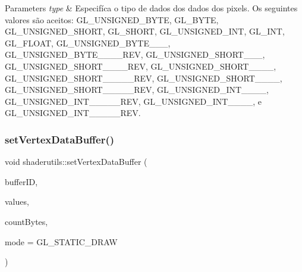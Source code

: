 \begin{DoxyParams}{Parameters}
\hline
{\em type} & Especifíca o tipo de dados dos dados dos pixels. Os seguintes valores são aceitos\+: G\+L\+\_\+\+U\+N\+S\+I\+G\+N\+E\+D\+\_\+\+B\+Y\+TE, G\+L\+\_\+\+B\+Y\+TE, G\+L\+\_\+\+U\+N\+S\+I\+G\+N\+E\+D\+\_\+\+S\+H\+O\+RT, G\+L\+\_\+\+S\+H\+O\+RT, G\+L\+\_\+\+U\+N\+S\+I\+G\+N\+E\+D\+\_\+\+I\+NT, G\+L\+\_\+\+I\+NT, G\+L\+\_\+\+F\+L\+O\+AT, G\+L\+\_\+\+U\+N\+S\+I\+G\+N\+E\+D\+\_\+\+B\+Y\+T\+E\+\_\+\_\+\_, G\+L\+\_\+\+U\+N\+S\+I\+G\+N\+E\+D\+\_\+\+B\+Y\+T\+E\+\_\+\_\+\_\+\_\+\+R\+EV, G\+L\+\_\+\+U\+N\+S\+I\+G\+N\+E\+D\+\_\+\+S\+H\+O\+R\+T\+\_\+\_\+\_, G\+L\+\_\+\+U\+N\+S\+I\+G\+N\+E\+D\+\_\+\+S\+H\+O\+R\+T\+\_\+\_\+\_\+\_\+\+R\+EV, G\+L\+\_\+\+U\+N\+S\+I\+G\+N\+E\+D\+\_\+\+S\+H\+O\+R\+T\+\_\+\_\+\_\+\_, G\+L\+\_\+\+U\+N\+S\+I\+G\+N\+E\+D\+\_\+\+S\+H\+O\+R\+T\+\_\+\_\+\_\+\_\+\_\+\+R\+EV, G\+L\+\_\+\+U\+N\+S\+I\+G\+N\+E\+D\+\_\+\+S\+H\+O\+R\+T\+\_\+\_\+\_\+\_, G\+L\+\_\+\+U\+N\+S\+I\+G\+N\+E\+D\+\_\+\+S\+H\+O\+R\+T\+\_\+\_\+\_\+\_\+\_\+\+R\+EV, G\+L\+\_\+\+U\+N\+S\+I\+G\+N\+E\+D\+\_\+\+I\+N\+T\+\_\+\_\+\_\+\_, G\+L\+\_\+\+U\+N\+S\+I\+G\+N\+E\+D\+\_\+\+I\+N\+T\+\_\+\_\+\_\+\_\+\_\+\+R\+EV, G\+L\+\_\+\+U\+N\+S\+I\+G\+N\+E\+D\+\_\+\+I\+N\+T\+\_\+\_\+\_\+\_, e G\+L\+\_\+\+U\+N\+S\+I\+G\+N\+E\+D\+\_\+\+I\+N\+T\+\_\+\_\+\_\+\_\+\_\+\+R\+EV. \\
\hline
\end{DoxyParams}
\mbox{\label{namespaceshaderutils_abb43fbeaf982bca26005030f22b80308}} 
\subsubsection{\texorpdfstring{set\+Vertex\+Data\+Buffer()}{setVertexDataBuffer()}}
{\footnotesize\ttfamily void shaderutils\+::set\+Vertex\+Data\+Buffer (\begin{DoxyParamCaption}\item[{G\+Luint}]{buffer\+ID,  }\item[{G\+Lfloat $\ast$}]{values,  }\item[{G\+Luint}]{count\+Bytes,  }\item[{G\+Lenum}]{mode = {\ttfamily GL\+\_\+STATIC\+\_\+DRAW} }\end{DoxyParamCaption})}

